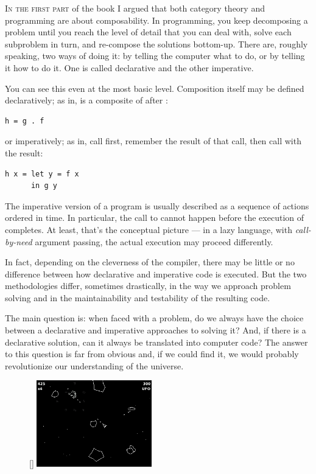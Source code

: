 \lettrine[lhang=0.17]{I}{n the first part} of the book I argued that both category theory and
programming are about composability. In programming, you keep
decomposing a problem until you reach the level of detail that you can
deal with, solve each subproblem in turn, and re-compose the solutions
bottom-up. There are, roughly speaking, two ways of doing it: by telling
the computer what to do, or by telling it how to do it. One is called
declarative and the other imperative.

You can see this even at the most basic level. Composition itself may be
defined declaratively; as in,  is a composite of 
after :

\begin{Verbatim}
h = g . f
\end{Verbatim}
or imperatively; as in, call  first, remember the result of
that call, then call  with the result:

\begin{Verbatim}
h x = let y = f x 
      in g y
\end{Verbatim}
The imperative version of a program is usually described as a sequence
of actions ordered in time. In particular, the call to  cannot
happen before the execution of  completes. At least, that's
the conceptual picture --- in a lazy language, with \emph{call-by-need}
argument passing, the actual execution may proceed differently.

In fact, depending on the cleverness of the compiler, there may be
little or no difference between how declarative and imperative code is
executed. But the two methodologies differ, sometimes drastically, in
the way we approach problem solving and in the maintainability and
testability of the resulting code.

The main question is: when faced with a problem, do we always have the
choice between a declarative and imperative approaches to solving it?
And, if there is a declarative solution, can it always be translated
into computer code? The answer to this question is far from obvious and,
if we could find it, we would probably revolutionize our understanding
of the universe.

\begin{figure}
\raisebox{0pt}[\dimexpr{}\baselineskip\relax]{
\includegraphics[width=50mm]{images/asteroids.png}}
\end{figure}

